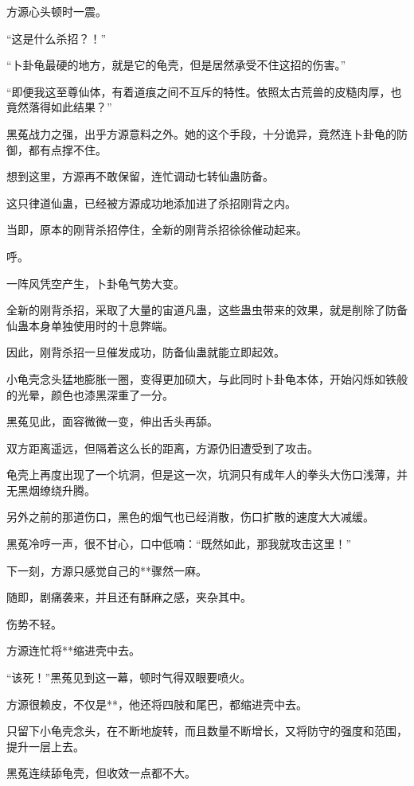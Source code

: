 
\begin{this_body}

方源心头顿时一震。

“这是什么杀招？！”

“卜卦龟最硬的地方，就是它的龟壳，但是居然承受不住这招的伤害。”

“即便我这至尊仙体，有着道痕之间不互斥的特性。依照太古荒兽的皮糙肉厚，也竟然落得如此结果？”

黑菟战力之强，出乎方源意料之外。她的这个手段，十分诡异，竟然连卜卦龟的防御，都有点撑不住。

想到这里，方源再不敢保留，连忙调动七转仙蛊防备。

这只律道仙蛊，已经被方源成功地添加进了杀招刚背之内。

当即，原本的刚背杀招停住，全新的刚背杀招徐徐催动起来。

呼。

一阵风凭空产生，卜卦龟气势大变。

全新的刚背杀招，采取了大量的宙道凡蛊，这些蛊虫带来的效果，就是削除了防备仙蛊本身单独使用时的十息弊端。

因此，刚背杀招一旦催发成功，防备仙蛊就能立即起效。

小龟壳念头猛地膨胀一圈，变得更加硕大，与此同时卜卦龟本体，开始闪烁如铁般的光晕，颜色也漆黑深重了一分。

黑菟见此，面容微微一变，伸出舌头再舔。

双方距离遥远，但隔着这么长的距离，方源仍旧遭受到了攻击。

龟壳上再度出现了一个坑洞，但是这一次，坑洞只有成年人的拳头大伤口浅薄，并无黑烟缭绕升腾。

另外之前的那道伤口，黑色的烟气也已经消散，伤口扩散的速度大大减缓。

黑菟冷哼一声，很不甘心，口中低喃：“既然如此，那我就攻击这里！”

下一刻，方源只感觉自己的**骤然一麻。

随即，剧痛袭来，并且还有酥麻之感，夹杂其中。

伤势不轻。

方源连忙将**缩进壳中去。

“该死！”黑菟见到这一幕，顿时气得双眼要喷火。

方源很赖皮，不仅是**，他还将四肢和尾巴，都缩进壳中去。

只留下小龟壳念头，在不断地旋转，而且数量不断增长，又将防守的强度和范围，提升一层上去。

黑菟连续舔龟壳，但收效一点都不大。


\end{this_body}
